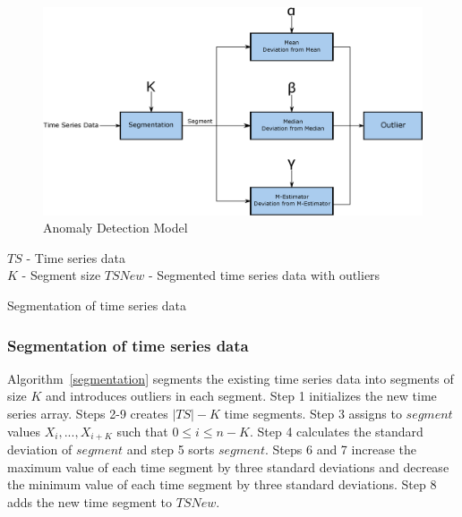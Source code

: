 \documentclass[conference]{IEEEtran}
\begin{document}
\begin{figure}
	\centering
	\includegraphics[width = 1 \linewidth]{anomalyDetectionModel.eps}
	\caption{Anomaly Detection Model}
	\label{anomalyDetectionModel}
\end{figure} 

\begin{algorithm}[t]
	\begin{algorithmic}[1]
		\renewcommand{\algorithmicrequire}{\textbf{Input:}}
		\renewcommand{\algorithmicensure}{\textbf{Output:}}
		\REQUIRE
		$TS$ - Time series data \\
		$K$ - Segment size
		\ENSURE
		$TSNew$ - Segmented time series data with outliers
		
		\ENDFOR
		
	\end{algorithmic}
	\caption{Segmentation of time series data}
	\label{segmentation}
\end{algorithm}

\subsubsection{Segmentation of time series data}Algorithm~\ref{segmentation} segments the existing time series data into segments of size $K$ and introduces outliers in each segment. Step 1 initializes the new time series array. Steps 2-9 creates $|TS| - K$ time segments. Step 3 assigns to  $segment$ values $X_i, ... , X_{i + K}$ such that $0 \leq i \leq n - K$. Step 4 calculates the standard deviation of $segment$ and step 5 sorts $segment$. Steps 6 and 7 increase the maximum value of each time segment by three standard deviations and decrease the minimum value of each time segment by three standard deviations. Step 8 adds the new time segment to $TSNew$.
\end{document}
